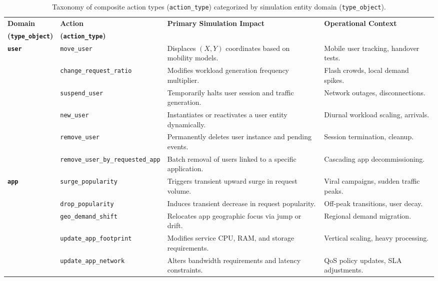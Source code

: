 \documentclass[ASNA]{USG} %
\begin{document}
\begin{center}
\begin{table}[!ht]%
\caption{Taxonomy of composite action types (\texttt{action\_type}) categorized by simulation entity domain (\texttt{type\_object}).\label{tab:composite_actions}}
\begin{tabular*}{\textwidth}{@{\extracolsep\fill}ll p{6.0cm} p{5.0cm}@{\extracolsep\fill}}
\toprule
\textbf{Domain} & \textbf{Action}  & \textbf{Primary Simulation Impact}  & \textbf{Operational Context}   \\
\textbf{(\texttt{type\_object})} & \textbf{(\texttt{action\_type})}  &   &    \\
\midrule
\multirow{6}{*}{\textbf{\texttt{user}}} 
 & \texttt{move\_user} & Displaces $(X, Y)$ coordinates based on mobility models. & Mobile user tracking, handover tests. \\
 & \texttt{change\_request\_ratio} & Modifies workload generation frequency multiplier. & Flash crowds, local demand spikes. \\
 & \texttt{suspend\_user} & Temporarily halts user session and traffic generation. & Network outages, disconnections. \\
 & \texttt{new\_user} & Instantiates or reactivates a user entity dynamically. & Diurnal workload scaling, arrivals. \\
 & \texttt{remove\_user} & Permanently deletes user instance and pending events. & Session termination, cleanup. \\
 & \texttt{remove\_user\_by\_requested\_app} & Batch removal of users linked to a specific application. & Cascading app decommissioning. \\
\midrule
\multirow{7}{*}{\textbf{\texttt{app}}} 
 & \texttt{surge\_popularity} & Triggers transient upward surge in request volume. & Viral campaigns, sudden traffic peaks. \\
 & \texttt{drop\_popularity} & Induces transient decrease in request popularity. & Off-peak transitions, user decay. \\
 & \texttt{geo\_demand\_shift} & Relocates app geographic focus via jump or drift. & Regional demand migration. \\
 & \texttt{update\_app\_footprint} & Modifies service CPU, RAM, and storage requirements. & Vertical scaling, heavy processing. \\
 & \texttt{update\_app\_network} & Alters bandwidth requirements and latency constraints. & QoS policy updates, SLA adjustments. \\

\end{tabular*}
\end{table}
\end{center}
\end{document}
